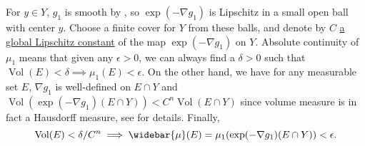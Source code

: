 For $y \in Y$, $g_1$ is smooth by ,
so $\exp( - \nabla g_1)$ is Lipschitz in a small open ball with center $y$.
Choose a finite cover for $Y$ from these balls,
and denote by $C$ \underline{a global Lipschitz constant} of the map \(\exp(-\nabla g_1)\) on $Y$.
Absolute continuity of $\mu_1$ means that given any $\epsilon > 0$,
we can always find a $\delta > 0$ such that $ \operatorname{Vol}(E) < \delta \implies \mu_1(E) < \epsilon$.
On the other hand, we have for any measurable set $E$,
$\nabla g_1$ is well-defined on $E \cap Y$ and
$\operatorname{Vol}( \exp(- \nabla g_1 )( E \cap Y )) < C^n \operatorname{Vol}(E \cap Y)$
since volume measure is in fact a Hausdorff measure,
see \cite[Propositions 12.6 and 12.12]{TaylorMichaelEugene1946} for details.
Finally,
\begin{equation}
	\label{equa:absolutely_continuity_estimation}
	\operatorname{Vol}(E) < \delta / C^n \implies \widebar{\mu}(E)
	=\mu_1(\exp(-\nabla g_1)(E \cap Y)) < \epsilon.
\end{equation}
